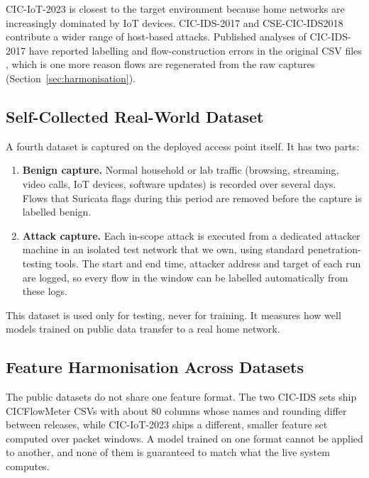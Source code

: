 \noindent CIC-IoT-2023 is closest to the target environment because home networks are increasingly dominated by IoT devices. CIC-IDS-2017 and CSE-CIC-IDS2018 contribute a wider range of host-based attacks. Published analyses of CIC-IDS-2017 have reported labelling and flow-construction errors in the original CSV files \cite{nidps:engelen2021}, which is one more reason flows are regenerated from the raw captures (Section~\ref{sec:harmonisation}).

\subsection{Self-Collected Real-World Dataset}\label{sec:5.2.2}
\label{sec:selfcollected}
\noindent A fourth dataset is captured on the deployed access point itself. It has two parts:
\begin{enumerate}
    \item \textbf{Benign capture.} Normal household or lab traffic (browsing, streaming, video calls, IoT devices, software updates) is recorded over several days. Flows that Suricata flags during this period are removed before the capture is labelled benign.
    \item \textbf{Attack capture.} Each in-scope attack is executed from a dedicated attacker machine in an isolated test network that we own, using standard penetration-testing tools. The start and end time, attacker address and target of each run are logged, so every flow in the window can be labelled automatically from these logs.
\end{enumerate}
\noindent This dataset is used only for testing, never for training. It measures how well models trained on public data transfer to a real home network.

\subsection{Feature Harmonisation Across Datasets}\label{sec:5.2.3}
\label{sec:harmonisation}
\noindent The public datasets do not share one feature format. The two CIC-IDS sets ship CICFlowMeter CSVs with about 80 columns whose names and rounding differ between releases, while CIC-IoT-2023 ships a different, smaller feature set computed over packet windows. A model trained on one format cannot be applied to another, and none of them is guaranteed to match what the live system computes.

